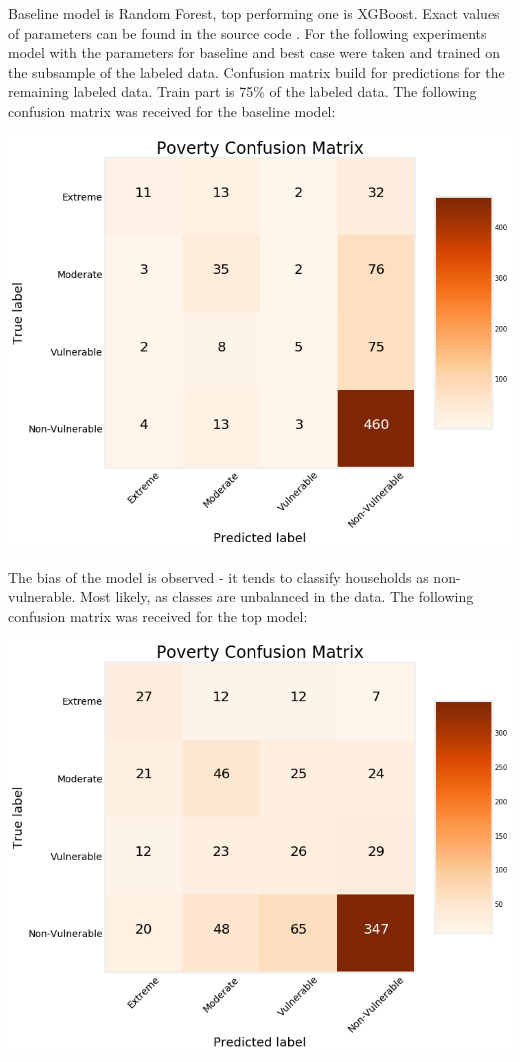     Baseline model is Random Forest, top performing one is XGBoost. Exact values of parameters can be found in the source code %
    . For the following experiments model with the parameters for baseline and best case were taken and trained on the subsample of the labeled data. Confusion matrix build for predictions for the remaining labeled data. Train part is 75\% of the labeled data. The following confusion matrix was received for the baseline model:
    \begin{center}
        \includegraphics[width=\textwidth]{images/confusion_matrix_rf.png}
    \end{center}

    The bias of the model is observed - it tends to classify households as non-vulnerable. Most likely, as classes are unbalanced in the data.
    The following confusion matrix was received for the top model:
    \begin{center}
        \includegraphics[width=\textwidth]{images/confusion_matrix_lgbm.png}
    \end{center}


